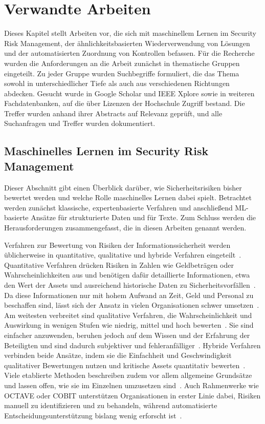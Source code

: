 \chapter{Verwandte Arbeiten}\label{cha:verwandt}
Dieses Kapitel stellt Arbeiten vor, die sich mit maschinellem Lernen im Security Risk Management, der ähnlichkeitsbasierten Wiederverwendung von Lösungen und der automatisierten Zuordnung von Kontrollen befassen.
Für die Recherche wurden die Anforderungen an die Arbeit zunächst in thematische Gruppen eingeteilt.
Zu jeder Gruppe wurden Suchbegriffe formuliert, die das Thema sowohl in unterschiedlicher Tiefe als auch aus verschiedenen Richtungen abdecken.
Gesucht wurde in Google Scholar und IEEE Xplore sowie in weiteren Fachdatenbanken, auf die über Lizenzen der Hochschule Zugriff bestand.
Die Treffer wurden anhand ihrer Abstracts auf Relevanz geprüft, und alle Suchanfragen und Treffer wurden dokumentiert.

\section{Maschinelles Lernen im Security Risk Management}\label{sec:rw-risk}
Dieser Abschnitt gibt einen Überblick darüber, wie Sicherheitsrisiken bisher bewertet werden und welche Rolle maschinelles Lernen dabei spielt.
Betrachtet werden zunächst klassische, expertenbasierte Verfahren und anschließend ML-basierte Ansätze für strukturierte Daten und für Texte.
Zum Schluss werden die Herausforderungen zusammengefasst, die in diesen Arbeiten genannt werden.

Verfahren zur Bewertung von Risiken der Informationssicherheit werden üblicherweise in quantitative, qualitative und hybride Verfahren eingeteilt~\cite[S.~15]{ShameliSendi2016}.
Quantitative Verfahren drücken Risiken in Zahlen wie Geldbeträgen oder Wahrscheinlichkeiten aus und benötigen dafür detaillierte Informationen, etwa den Wert der Assets und ausreichend historische Daten zu Sicherheitsvorfällen~\cite[S.~20]{ShameliSendi2016}.
Da diese Informationen nur mit hohem Aufwand an Zeit, Geld und Personal zu beschaffen sind, lässt sich der Ansatz in vielen Organisationen schwer umsetzen~\cite[S.~20]{ShameliSendi2016}.
Am weitesten verbreitet sind qualitative Verfahren, die Wahrscheinlichkeit und Auswirkung in wenigen Stufen wie niedrig, mittel und hoch bewerten~\cite[S.~20]{ShameliSendi2016}.
Sie sind einfacher anzuwenden, beruhen jedoch auf dem Wissen und der Erfahrung der Beteiligten und sind dadurch subjektiver und fehleranfälliger~\cite[S.~20]{ShameliSendi2016}.
Hybride Verfahren verbinden beide Ansätze, indem sie die Einfachheit und Geschwindigkeit qualitativer Bewertungen nutzen und kritische Assets quantitativ bewerten~\cite[S.~20]{ShameliSendi2016}.
Viele etablierte Methoden beschreiben zudem vor allem allgemeine Grundsätze und lassen offen, wie sie im Einzelnen umzusetzen sind~\cite[S.~15]{ShameliSendi2016}.
Auch Rahmenwerke wie OCTAVE oder COBIT unterstützen Organisationen in erster Linie dabei, Risiken manuell zu identifizieren und zu behandeln, während automatisierte Entscheidungsunterstützung bislang wenig erforscht ist~\cite[S.~2553]{Bettaieb2020}.

